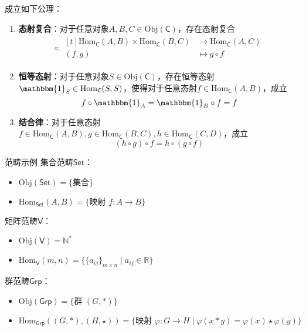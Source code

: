\documentclass{beamer}
\newcommand{\N}{\mathbb{N}}            %
\newcommand{\R}{\mathbb{R}}            %
\begin{document}
\begin{frame}
	成立如下公理：
	\begin{enumerate}
		\item {\bf 态射复合}：对于任意对象$A,B,C\in\mathrm{Obj}(\mathsf{C})$，存在态射复合
		\begin{align*}
			\circ :\begin{aligned}[t]
				\mathrm{Hom}_\mathsf{C}(A,B)\times \mathrm{Hom}_\mathsf{C}(B,C)&\longrightarrow \mathrm{Hom}_\mathsf{C}(A,C)\\
				(f,g)&\longmapsto g\circ f
			\end{aligned}
		\end{align*}
		\item {\bf 恒等态射}：对于任意对象$S\in\mathrm{Obj}(\mathsf{C})$，存在恒等态射$\mathbbm{1}_S\in\mathrm{Hom}_\mathsf{C}(S,S)$，使得对于任意态射$f\in \mathrm{Hom}_\mathsf{C}(A,B)$，成立
		$$
		f\circ\mathbbm{1}_A=\mathbbm{1}_B\circ f=f
		$$
		\item {\bf 结合律}：对于任意态射$f\in \mathrm{Hom}_\mathsf{C}(A,B),g\in \mathrm{Hom}_\mathsf{C}(B,C),h\in \mathrm{Hom}_\mathsf{C}(C,D)$，成立
		$$
		(h\circ g)\circ f=h\circ (g\circ f)
		$$
	\end{enumerate}
\end{frame}

\begin{frame}{范畴示例}
	集合范畴$\mathsf{Set}$：
	\begin{itemize}
		\item $\mathrm{Obj}(\mathsf{Set})=\{ \text{集合} \}$
		\item $\mathrm{Hom}_{\mathsf{Set}}(A,B)=\{ \text{映射 }f:A\to B \}$
	\end{itemize}

	矩阵范畴$\mathsf{V}$：
	\begin{itemize}
		\item $\mathrm{Obj}(\mathsf{V})=\N^*$
		\item $\mathrm{Hom}_{\mathsf{V}}(m,n)=\{ \{a_{ij}\}_{m\times n}\mid a_{ij}\in\R \}$
	\end{itemize}

	群范畴$\mathsf{Grp}$：
	\begin{itemize}
		\item $\mathrm{Obj}(\mathsf{Grp})=\{ \text{群 }(G,*) \}$
		\item $\mathrm{Hom}_{\mathsf{Grp}}((G,*),(H,\star))=\{ \text{映射 }\varphi:G\to H\mid \varphi(x*y)=\varphi(x)\star \varphi(y) \}$
	\end{itemize}
\end{frame}
\end{document}
